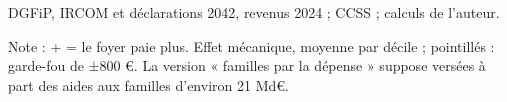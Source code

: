 DGFiP, IRCOM et déclarations 2042, revenus 2024 ; CCSS ; calculs de l'auteur.\par Note : + = le foyer paie plus. Effet mécanique, moyenne par décile ; pointillés : garde-fou de ±800 \euro{}. La version « familles par la dépense » suppose versées à part des aides aux familles d'environ 21 Md\euro{}.
